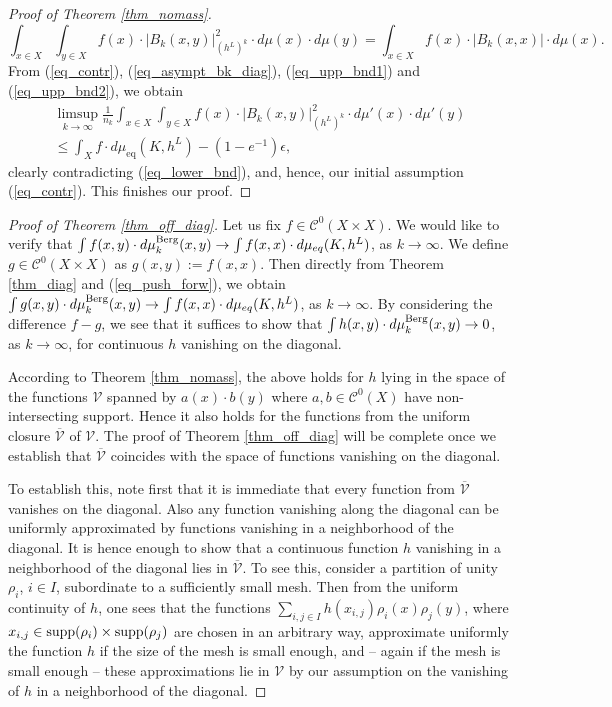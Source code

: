 \documentclass[12pt]{article}
\numberwithin{equation}{section}
\theoremstyle{theorem}
\theoremstyle{definition}
\theoremstyle{remark}
\newcommand{\ccal}{\mathscr{C}}
\begin{document}
\begin{proof}[Proof of Theorem \ref{thm_nomass}]
\begin{equation}
			\int_{x \in X} \int_{y \in X} f(x) \cdot |B_k(x, y)|^{2}_{(h^L)^k} \cdot d \mu(x) \cdot d \mu(y)
			=
			\int_{x \in X} f(x) \cdot |B_k(x, x)| \cdot d \mu(x).
		\end{equation}
		From (\ref{eq_contr}), (\ref{eq_asympt_bk_diag}), (\ref{eq_upp_bnd1}) and  (\ref{eq_upp_bnd2}), we obtain
		\begin{multline}
			\limsup_{k \to \infty}
			\frac{1}{n_k}
			\int_{x \in X} \int_{y \in X} f(x) \cdot |B_k(x, y)|^{2}_{(h^L)^k} \cdot d \mu'(x) \cdot d \mu'(y)
			\\
			\leq
			\int_{X} f \cdot d \mu_{\mathrm{eq}}(K, h^L) - (1 - e^{-1}) \epsilon,
		\end{multline}
		clearly contradicting (\ref{eq_lower_bnd}), and, hence, our initial assumption (\ref{eq_contr}).
		This finishes our proof.
	\end{proof}
	
	\begin{proof}[Proof of Theorem \ref{thm_off_diag}]
		Let us fix $f \in \ccal^0(X \times X)$.
		We would like to verify that $\int f(x, y) \cdot d \mu_k^{\rm{Berg}}(x, y) \to \int f(x, x) \cdot d \mu_{eq}(K, h^L)$, as $k \to \infty$.
		We define $g \in \ccal^0(X \times X)$ as $g(x, y) := f(x, x)$.
		Then directly from Theorem \ref{thm_diag} and (\ref{eq_push_forw}), we obtain $\int g(x, y) \cdot d \mu_k^{\rm{Berg}}(x, y) \to \int f(x, x) \cdot d \mu_{eq}(K, h^L)$, as $k \to \infty$.
		By considering the difference $f - g$, we see that it suffices to show that $\int h(x, y) \cdot d \mu_k^{\rm{Berg}}(x, y) \to 0$, as $k \to \infty$, for continuous $h$ vanishing on the diagonal.
		\par 
		According to Theorem \ref{thm_nomass}, the above holds for $h$ lying in the space of the functions $\mathcal{V}$ spanned by $a(x) \cdot b(y)$ where $a, b \in \ccal^0(X)$ have non-intersecting support.
		Hence it also holds for the functions from the uniform closure $\overline{\mathcal{V}}$ of $\mathcal{V}$.
		The proof of Theorem \ref{thm_off_diag} will be complete once we establish that $\overline{\mathcal{V}}$ coincides with the space of functions vanishing on the diagonal.
		\par 
		To establish this, note first that it is immediate that every function from $\overline{\mathcal{V}}$ vanishes on the diagonal.
		Also any function vanishing along the diagonal can be uniformly approximated by functions vanishing in a neighborhood of the diagonal.
		It is hence enough to show that a continuous function $h$ vanishing in a neighborhood of the diagonal lies in $\overline{\mathcal{V}}$.
		To see this, consider a partition of unity $\rho_i$, $i \in I$, subordinate to a sufficiently small mesh.
		Then from the uniform continuity of $h$, one sees that the functions $\sum_{i, j \in I} h(x_{i, j}) \rho_i(x) \rho_j(y)$, where $x_{i, j} \in {\rm{supp}} (\rho_i) \times {\rm{supp}} (\rho_j)$ are chosen in an arbitrary way, approximate uniformly the function $h$ if the size of the mesh is small enough, and -- again if the mesh is small enough -- these approximations lie in $\mathcal{V}$ by our assumption on the vanishing of $h$ in a neighborhood of the diagonal.
	\end{proof}
	
\end{document}
